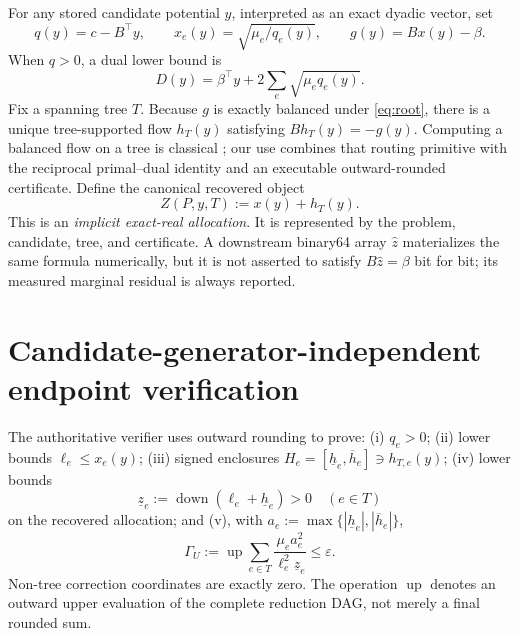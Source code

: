 \documentclass[smallextended,envcountsect]{svjour3}
\begin{document}
For any stored candidate potential $y$, interpreted as an exact dyadic vector,
set
\begin{equation}
 q(y)=c-B^\top y,\qquad
 x_e(y)=\sqrt{\mu_e/q_e(y)},\qquad
 g(y)=Bx(y)-\beta.
 \label{eq:dual-state}
\end{equation}
When $q>0$, a dual lower bound is
\begin{equation}
 D(y)=\beta^\top y+2\sum_e\sqrt{\mu_eq_e(y)}.
 \label{eq:dual}
\end{equation}
Fix a spanning tree $T$.  Because $g$ is exactly balanced under
\cref{eq:root}, there is a unique tree-supported flow $h_T(y)$ satisfying
$Bh_T(y)=-g(y)$.  Computing a balanced flow on a tree is classical
\citep{ahuja1993network}; our use combines that routing primitive with the
reciprocal primal--dual identity and an executable outward-rounded certificate.
Define the canonical recovered object
\begin{equation}
 Z(P,y,T):=x(y)+h_T(y).
 \label{eq:implicit-z}
\end{equation}
This is an \emph{implicit exact-real allocation}.  It is represented by the
problem, candidate, tree, and certificate.  A downstream binary64 array
$\widehat z$ materializes the same formula numerically, but it is not asserted
to satisfy $B\widehat z=\beta$ bit for bit; its measured marginal residual is
always reported.

\section{Candidate-generator-independent endpoint verification}
\label{sec:verifier}

The authoritative verifier uses outward rounding to prove: (i) $q_e>0$;
(ii) lower bounds $\ell_e\le x_e(y)$; (iii) signed enclosures
$H_e=[\underline h_e,\overline h_e]\ni h_{T,e}(y)$; (iv) lower
bounds
\[
 \underline z_e:=\operatorname{down}(\ell_e+\underline h_e)>0
 \quad(e\in T)
\]
on the recovered allocation; and (v), with
$a_e:=\max\{|\underline h_e|,|\overline h_e|\}$,
\begin{equation}
 \Gamma_U:=\operatorname{up}\!\sum_{e\in T}
 \frac{\mu_ea_e^2}{\ell_e^2\underline z_e}\le\varepsilon.
 \label{eq:gamma}
\end{equation}
Non-tree correction coordinates are exactly zero.  The operation
$\operatorname{up}$ denotes an outward upper evaluation of the complete
reduction DAG, not merely a final rounded sum.
\end{document}
